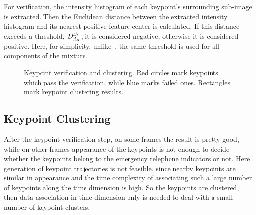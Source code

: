 \documentclass{JoITSRstyle}
\begin{document}
For verification, the intensity histogram of each keypoint's surrounding sub-image is extracted. Then the Euclidean distance between the extracted intensity histogram and its nearest positive feature center is calculated. If this distance exceeds a threshold, $D^{th}_{A_{\bf{x}}}$, it is considered negative, otherwise it is considered positive. Here, for simplicity, unlike~\cite{ac33}, the same threshold is used for all components of the mixture.

\begin{figure}
\centering
{}
\caption{Keypoint verification and clustering. Red circles mark keypoints which pass the verification, while blue marks failed ones. Rectangles mark keypoint clustering results. }
\label{fig:thir}
\end{figure}
\subsection{Keypoint Clustering}
After the keypoint verification step, on some frames the result is pretty good, while on other frames appearance of the keypoints is not enough to decide whether the keypoints belong to the emergency telephone indicators or not. Here generation of keypoint trajectories is not feasible, since nearby keypoints are similar in appearance and  the time complexity of associating such a large number of keypoints along the time dimension is high. So the keypoints are clustered, then data association in time dimension only is needed to deal with a small number of keypoint clusters.
\end{document}
